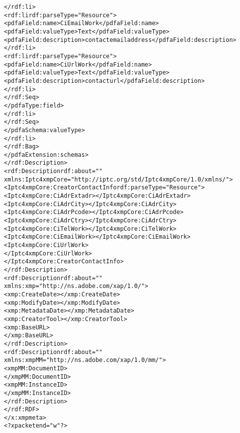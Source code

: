 \begin{alltt}
                            </rdf:li>
                            <rdf:li rdf:parseType="Resource">
                              <pdfaField:name>CiEmailWork</pdfaField:name>
                              <pdfaField:valueType>Text</pdfaField:valueType>
                              <pdfaField:description>contact email address</pdfaField:description>
                            </rdf:li>
                            <rdf:li rdf:parseType="Resource">
                              <pdfaField:name>CiUrlWork</pdfaField:name>
                              <pdfaField:valueType>Text</pdfaField:valueType>
                              <pdfaField:description>contact url</pdfaField:description>
                            </rdf:li>
                          </rdf:Seq>
                        </pdfaType:field>
                      </rdf:li>
                    </rdf:Seq>
                  </pdfaSchema:valueType>
                </rdf:li>
              </rdf:Bag>
            </pdfaExtension:schemas>
          </rdf:Description>
          <rdf:Description rdf:about=""
               xmlns:Iptc4xmpCore="http://iptc.org/std/Iptc4xmpCore/1.0/xmlns/">
           <Iptc4xmpCore:CreatorContactInfo rdf:parseType="Resource">
             <Iptc4xmpCore:CiAdrExtadr></Iptc4xmpCore:CiAdrExtadr>
             <Iptc4xmpCore:CiAdrCity></Iptc4xmpCore:CiAdrCity>
             <Iptc4xmpCore:CiAdrPcode></Iptc4xmpCore:CiAdrPcode>
             <Iptc4xmpCore:CiAdrCtry></Iptc4xmpCore:CiAdrCtry>
             <Iptc4xmpCore:CiTelWork></Iptc4xmpCore:CiTelWork>
             <Iptc4xmpCore:CiEmailWork></Iptc4xmpCore:CiEmailWork>
             <Iptc4xmpCore:CiUrlWork>
             </Iptc4xmpCore:CiUrlWork>
           </Iptc4xmpCore:CreatorContactInfo>
          </rdf:Description>
          <rdf:Description rdf:about=""
                xmlns:xmp="http://ns.adobe.com/xap/1.0/">
             <xmp:CreateDate>\metavalue{\todayISO}</xmp:CreateDate>
             <xmp:ModifyDate>\metavalue{\todayISO}</xmp:ModifyDate>
             <xmp:MetadataDate>\metavalue{\todayISO}</xmp:MetadataDate>
             <xmp:CreatorTool></xmp:CreatorTool>
             <xmp:BaseURL>
             </xmp:BaseURL>
          </rdf:Description>
          <rdf:Description rdf:about=""
                xmlns:xmpMM="http://ns.adobe.com/xap/1.0/mm/">
             <xmpMM:DocumentID>
             </xmpMM:DocumentID>
             <xmpMM:InstanceID>
             </xmpMM:InstanceID>
          </rdf:Description>
       </rdf:RDF>
    </x:xmpmeta>
    <?xpacket end="w"?>
\end{alltt}
